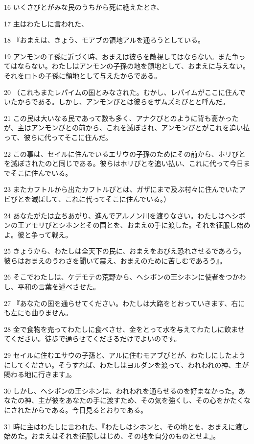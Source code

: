 \par 16 いくさびとがみな民のうちから死に絶えたとき、
\par 17 主はわたしに言われた、
\par 18 『おまえは、きょう、モアブの領地アルを通ろうとしている。
\par 19 アンモンの子孫に近づく時、おまえは彼らを敵視してはならない。また争ってはならない。わたしはアンモンの子孫の地を領地として、おまえに与えない。それをロトの子孫に領地として与えたからである。
\par 20 （これもまたレパイムの国とみなされた。むかし、レパイムがここに住んでいたからである。しかし、アンモンびとは彼らをザムズミびとと呼んだ。
\par 21 この民は大いなる民であって数も多く、アナクびとのように背も高かったが、主はアンモンびとの前から、これを滅ぼされ、アンモンびとがこれを追い払って、彼らに代ってそこに住んだ。
\par 22 この事は、セイルに住んでいるエサウの子孫のためにその前から、ホリびとを滅ぼされたのと同じである。彼らはホリびとを追い払い、これに代って今日までそこに住んでいる。
\par 23 またカフトルから出たカフトルびとは、ガザにまで及ぶ村々に住んでいたアビびとを滅ぼして、これに代ってそこに住んでいる。）
\par 24 あなたがたは立ちあがり、進んでアルノン川を渡りなさい。わたしはヘシボンの王アモリびとシホンとその国とを、おまえの手に渡した。それを征服し始めよ。彼と争って戦え。
\par 25 きょうから、わたしは全天下の民に、おまえをおびえ恐れさせるであろう。彼らはおまえのうわさを聞いて震え、おまえのために苦しむであろう』。
\par 26 そこでわたしは、ケデモテの荒野から、ヘシボンの王シホンに使者をつかわし、平和の言葉を述べさせた。
\par 27 『あなたの国を通らせてください。わたしは大路をとおっていきます、右にも左にも曲りません。
\par 28 金で食物を売ってわたしに食べさせ、金をとって水を与えてわたしに飲ませてください。徒歩で通らせてくださるだけでよいのです。
\par 29 セイルに住むエサウの子孫と、アルに住むモアブびとが、わたしにしたようにしてください。そうすれば、わたしはヨルダンを渡って、われわれの神、主が賜わる地に行きます』。
\par 30 しかし、ヘシボンの王シホンは、われわれを通らせるのを好まなかった。あなたの神、主が彼をあなたの手に渡すため、その気を強くし、その心をかたくなにされたからである。今日見るとおりである。
\par 31 時に主はわたしに言われた、『わたしはシホンと、その地とを、おまえに渡し始めた。おまえはそれを征服しはじめ、その地を自分のものとせよ』。
